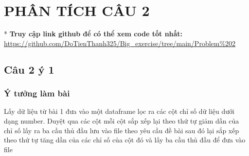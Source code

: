 \section{PHÂN TÍCH CÂU 2}
\setcounter{section}{2}
* \textbf{Truy cập link github để có thể xem code tốt nhất:}  \url{https://github.com/DoTienThanh325/Big_exercise/tree/main/Problem%202}
\subsection{Câu 2 ý 1}
\subsubsection{Ý tưởng làm bài}
Lấy dữ liệu từ bài 1 đưa vào một dataframe lọc ra các cột chỉ số dữ liệu dưới dạng number. Duyệt qua các cột mỗi cột sắp xếp lại theo thứ tự giảm dần của chỉ số lấy ra ba cầu thủ đầu lưu vào file theo yêu cầu đề bài sau đó lại sắp xếp theo thứ tự tăng dần của các chỉ số của cột đó và lấy ba cầu thủ đầu để đưa vào file

